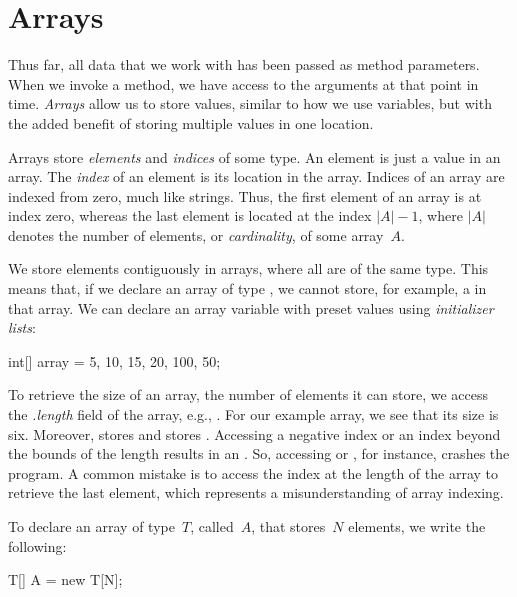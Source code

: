 \section{Arrays}

Thus far, all data that we work with has been passed as method parameters. 
When we invoke a method, we have access to the arguments at that point in time. 
\emph{Arrays} allow us to store values, similar to how we use variables, but with the added benefit of storing multiple values in one location.

Arrays store \emph{elements} and \emph{indices} of some type. 
An element is just a value in an array. 
The \emph{index} of an element is its location in the array. 
Indices of an array are indexed from zero, much like strings. 
Thus, the first element of an array is at index zero, whereas the last element is located at the index $|A| - 1$, where $|A|$ denotes the number of elements, or \emph{cardinality}, of some array~$A$.

We store elements contiguously in arrays, where all are of the same type. 
This means that, if we declare an array of type , we cannot store, for example, a  in that array. 
We can declare an array variable with preset values using \emph{initializer lists}:

\begin{verbnobox}[\small]
int[] array = {5, 10, 15, 20, 100, 50};
\end{verbnobox}

To retrieve the size of an array, the number of elements it can store, we access the \emph{.length} field of the array, e.g., . 
For our example array, we see that its size is six. 
Moreover,  stores  and  stores . 
Accessing a negative index or an index beyond the bounds of the length results in an . 
So, accessing  or , for instance, crashes the program. 
A common mistake is to access the index at the length of the array to retrieve the last element, which represents a misunderstanding of array indexing.

\enlargethispage{-1\baselineskip}
To declare an array of type~$T$, called~$A$, that stores~$N$ elements, we write the following:

\begin{verbnobox}[\small]
T[] A = new T[N];
\end{verbnobox}

